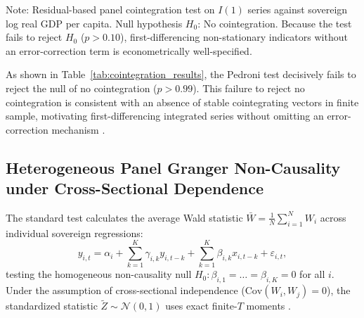 \documentclass[11pt,a4paper]{article}
\begin{document}
\begin{table}[ht]
\centering
\small
\caption{Pedroni (1999, 2004) panel cointegration tests for non-stationary non-economic indicators}
\label{tab:cointegration_results}
\begin{flushleft}
\footnotesize Note: Residual-based panel cointegration test on $I(1)$ series against sovereign log real GDP per capita. Null hypothesis $H_0$: No cointegration. Because the test fails to reject $H_0$ ($p > 0.10$), first-differencing non-stationary indicators without an error-correction term is econometrically well-specified.
\end{flushleft}
\end{table}

As shown in Table~\ref{tab:cointegration_results}, the Pedroni test decisively fails to reject the null of no cointegration ($p > 0.99$). This failure to reject no cointegration is consistent with an absence of stable cointegrating vectors in finite sample, motivating first-differencing integrated series without omitting an error-correction mechanism \citep{westerlund2007}.


\subsection{Heterogeneous Panel Granger Non-Causality under Cross-Sectional Dependence}

The standard \citet{dumitrescu2012} test calculates the average Wald statistic $\bar{W} = \frac{1}{N}\sum_{i=1}^N W_i$ across individual sovereign regressions:
\begin{equation}
y_{i,t} = \alpha_i + \sum_{k=1}^K \gamma_{i,k} y_{i,t-k} + \sum_{k=1}^K \beta_{i,k} x_{i,t-k} + \varepsilon_{i,t},
\end{equation}
testing the homogeneous non-causality null $H_0: \beta_{i,1} = \dots = \beta_{i,K} = 0$ for all $i$. Under the assumption of cross-sectional independence ($\text{Cov}(W_i, W_j) = 0$), the standardized statistic $\tilde{Z} \sim \mathcal{N}(0, 1)$ uses exact finite-$T$ moments \citep{dumitrescu2012}.
\end{document}

